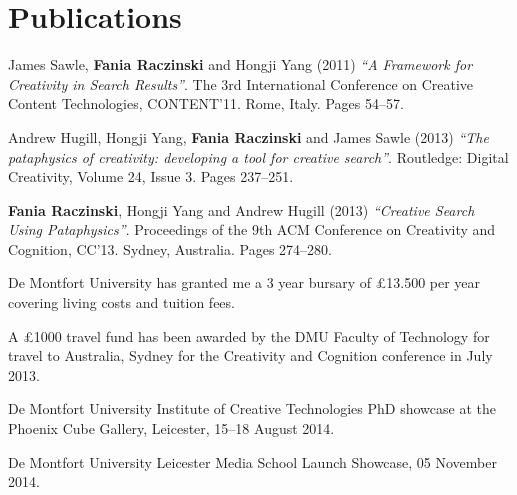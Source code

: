 
\pagestyle{empty}

\chapter{Publications}
\label{pubs}

James Sawle, \textbf{Fania Raczinski} and Hongji Yang (2011) \emph{``A Framework for Creativity in Search Results''}. The 3rd International Conference on Creative Content Technologies, CONTENT'11. Rome, Italy. Pages 54--57.

Andrew Hugill, Hongji Yang, \textbf{Fania Raczinski} and James Sawle (2013) \emph{``The pataphysics of creativity: developing a tool for creative search''}. Routledge: Digital Creativity, Volume 24, Issue 3. Pages 237--251.

\textbf{Fania Raczinski}, Hongji Yang and Andrew Hugill (2013) \emph{``Creative Search Using Pataphysics''}. Proceedings of the 9th ACM Conference on Creativity and Cognition, CC'13. Sydney, Australia. Pages 274--280.

\grule{}

De Montfort University has granted me a 3 year bursary of £13.500 per year covering living costs and tuition fees.

A £1000 travel fund has been awarded by the DMU Faculty of Technology for travel to Australia, Sydney for the Creativity and Cognition conference in July 2013.

\grule{}

De Montfort University Institute of Creative Technologies PhD showcase at the Phoenix Cube Gallery, Leicester, 15--18 August 2014.

De Montfort University Leicester Media School Launch Showcase, 05 November 2014.

\clearpage
